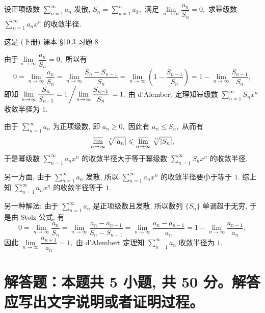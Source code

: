 \begin{question}[points = 10]
  设正项级数 $\sum\limits_{n=1}^{\infty} a_n$ 发散, $S_n = \sum\limits_{k=1}^{n} a_k,$ 满足 $\lim\limits_{n\to\infty} \dfrac{a_n}{S_n} = 0,$ 求幂级数 $\sum\limits_{n=1}^{\infty} a_n x^n$ 的收敛半径.

\end{question}

\begin{solution}
  这是 (下册) 课本 \S 10.3 习题 8

  由于$\lim\limits_{n\to\infty} \dfrac{a_n}{S_n} = 0,$ 所以有
  $$0 = \lim\limits_{n\to\infty} \dfrac{a_n}{S_n} = \lim\limits_{n\to\infty} \dfrac{S_n - S_{n-1}}{S_n} = \lim\limits_{n\to\infty} \left( 1 - \dfrac{S_{n-1}}{S_n} \right) = 1 - \lim\limits_{n\to\infty} \dfrac{S_{n-1}}{S_n},$$
  即知 $\lim\limits_{n\to\infty} \dfrac{S_n}{S_{n-1}} = 1 \left/ \lim\limits_{n\to\infty} \dfrac{S_{n-1}}{S_n} \right. = 1.$ 由 d'Alembert 定理知幂级数 $\sum\limits_{n=1}^{\infty} S_n x^n$ 收敛半径为 $1.$

  由于 $\sum\limits_{n=1}^{\infty} a_n$ 为正项级数, 即 $a_n \geqslant 0,$ 因此有 $a_n \leqslant S_n,$ 从而有
  $$\varlimsup_{n\to\infty} \nroot[n]{\lvert a_n \rvert} \leqslant \varlimsup_{n\to\infty} \nroot[n]{\lvert S_n \rvert},$$
  于是幂级数 $\sum\limits_{n=1}^{\infty} a_n x^n$ 的收敛半径大于等于幂级数 $\sum\limits_{n=1}^{\infty} S_n x^n$ 的收敛半径.

  另一方面, 由于 $\sum\limits_{n=1}^{\infty} a_n$ 发散, 所以 $\sum\limits_{n=1}^{\infty} a_n x^n$ 的收敛半径要小于等于 $1.$ 综上知 $\sum\limits_{n=1}^{\infty} a_n x^n$ 的收敛半径等于 $1.$

  另一种解法: 由于 $\sum\limits_{n=1}^{\infty} a_n$ 是正项级数且发散, 所以数列 $\{S_n\}$ 单调趋于无穷, 于是由 Stolz 公式, 有
  $$0 = \lim\limits_{n\to\infty} \dfrac{a_n}{S_n} = \lim\limits_{n\to\infty} \dfrac{a_n-a_{n-1}}{S_n-S_{n-1}} = \lim\limits_{n\to\infty} \dfrac{a_n-a_{n-1}}{a_n} = 1 -\lim\limits_{n\to\infty} \dfrac{a_{n-1}}{a_n},$$
  因此 $\lim\limits_{n\to\infty} \dfrac{a_{n+1}}{a_n} = 1,$ 由 d'Alembert 定理知 $\sum\limits_{n=1}^{\infty} a_n$ 收敛半径为 $1.$
\end{solution}


\section{解答题：本题共 5 小题, 共 50 分。解答应写出文字说明或者证明过程。}


